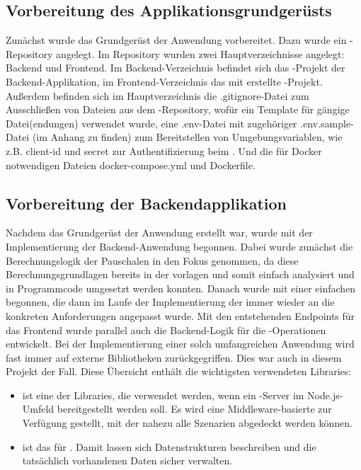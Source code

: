 \subsection{Vorbereitung des Applikationsgrundgerüsts}

Zunächst wurde das Grundgerüst der Anwendung vorbereitet. Dazu wurde ein -Repository angelegt. Im Repository wurden zwei Hauptverzeichnisse angelegt: Backend und Frontend. Im Backend-Verzeichnis befindet sich das -Projekt der Backend-Applikation, im Frontend-Verzeichnis das mit  erstellte  -Projekt. Außerdem befinden sich im Hauptverzeichnis die .gitignore-Datei zum Ausschließen von Dateien aus dem -Repository, wofür ein Template für gängige Datei(endungen) verwendet wurde, eine .env-Datei mit zugehöriger .env.sample-Datei (im Anhang zu finden) zum Bereitstellen von Umgebungsvariablen, wie z.B. client-id und secret zur Authentifizierung beim . Und die für Docker notwendigen Dateien docker-compose.yml und Dockerfile.

\subsection{Vorbereitung der Backendapplikation}

Nachdem das Grundgerüst der Anwendung erstellt war, wurde mit der Implementierung der Backend-Anwendung begonnen. Dabei wurde zunächst die Berechnungslogik der Pauschalen in den Fokus genommen, da diese Berechnungsgrundlagen bereits in der  vorlagen und somit einfach analysiert und in Programmcode umgesetzt werden konnten. Danach wurde mit einer einfachen   begonnen, die dann im Laufe der Implementierung der  immer wieder an die konkreten Anforderungen angepasst wurde. Mit den entstehenden Endpoints für das Frontend wurde parallel auch die Backend-Logik für die -Operationen entwickelt. Bei der Implementierung einer solch umfangreichen Anwendung wird fast immer auf externe Bibliotheken zurückgegriffen. Dies war auch in diesem Projekt der Fall. Diese Übersicht enthält die wichtigsten verwendeten Libraries:

\begin{itemize}
    \item {} ist eine der Libraries, die verwendet werden, wenn ein -Server im Node.js-Umfeld bereitgestellt werden soll. Es wird eine Middleware-basierte  zur Verfügung gestellt, mit der nahezu alle Szenarien abgedeckt werden können.
    \item {} ist das  für . Damit lassen sich Datenstrukturen beschreiben und die tatsächlich vorhandenen Daten sicher verwalten.
\end{itemize}

